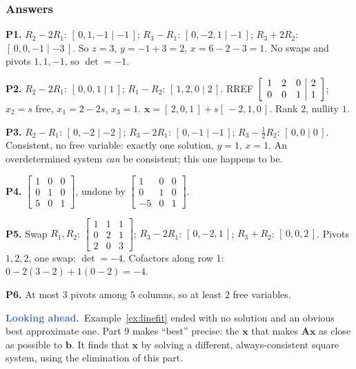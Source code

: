 \documentclass[11pt]{article}
\theoremstyle{plain}
\theoremstyle{definition}
\theoremstyle{remark}
\newcommand{\lookahead}{\par\smallskip\noindent
  \textbf{\sffamily\textcolor{RoyalBlue}{Looking ahead.}}\ \ignorespaces}
\newcommand{\vc}[1]{\mathbf{#1}}
\newcommand{\mt}[1]{\mathbf{#1}}
\newenvironment{aug}[1]{\left[\begin{array}{#1}}{\end{array}\right]}
\begin{document}
\subsubsection*{Answers}

\noindent\textbf{P1.} $R_2-2R_1$: $[\,0,1,-1\mid-1\,]$; $R_3-R_1$:
$[\,0,-2,1\mid-1\,]$; $R_3+2R_2$: $[\,0,0,-1\mid-3\,]$. So $z=3$, $y=-1+3=2$,
$x=6-2-3=1$. No swaps and pivots $1,1,-1$, so $\det=-1$.

\smallskip
\noindent\textbf{P2.} $R_2-2R_1$: $[\,0,0,1\mid1\,]$; $R_1-R_2$:
$[\,1,2,0\mid2\,]$. RREF
$\begin{aug}{ccc|c}1&2&0&2\\0&0&1&1\end{aug}$; $x_2=s$ free, $x_1=2-2s$, $x_3=1$.
$\vc{x}=[\,2,0,1\,]+s[\,-2,1,0\,]$. Rank $2$, nullity $1$.

\smallskip
\noindent\textbf{P3.} $R_2-R_1$: $[\,0,-2\mid-2\,]$; $R_3-2R_1$:
$[\,0,-1\mid-1\,]$; $R_3-\frac12R_2$: $[\,0,0\mid0\,]$. Consistent, no free
variable: exactly one solution, $y=1$, $x=1$. An overdetermined system
\emph{can} be consistent; this one happens to be.

\smallskip
\noindent\textbf{P4.} $\begin{bmatrix}1&0&0\\0&1&0\\5&0&1\end{bmatrix}$, undone by
$\begin{bmatrix}1&0&0\\0&1&0\\-5&0&1\end{bmatrix}$.

\smallskip
\noindent\textbf{P5.} Swap $R_1,R_2$: $\begin{bmatrix}1&1&1\\0&2&1\\2&0&3\end{bmatrix}$;
$R_3-2R_1$: $[\,0,-2,1\,]$; $R_3+R_2$: $[\,0,0,2\,]$. Pivots $1,2,2$, one swap:
$\det=-4$. Cofactors along row 1: $0-2(3-2)+1(0-2)=-4$. \checkmark

\smallskip
\noindent\textbf{P6.} At most $3$ pivots among $5$ columns, so at least $2$ free
variables.

\lookahead Example~\ref{ex:linefit} ended with no solution and an obvious best
approximate one. Part 9 makes ``best'' precise: the $\vc{x}$ that makes
$\mt{A}\vc{x}$ as close as possible to $\vc{b}$. It finds that $\vc{x}$ by solving a
different, always-consistent square system, using the elimination of this part.
\end{document}
